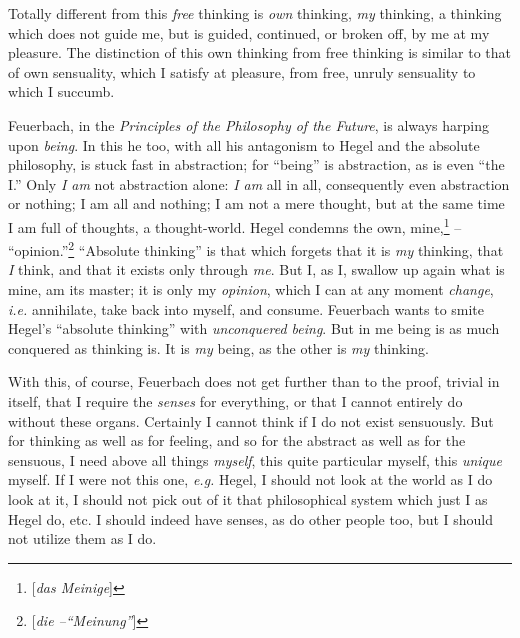 \documentclass[12pt,a4paper]{book}
\begin{document}
Totally different from this \textit{free} thinking is \textit{own} thinking, 
\textit{my} thinking, a thinking which does not guide me, but is guided, 
continued, or broken off, by me at my pleasure. The distinction of this own 
thinking from free thinking is similar to that of own sensuality, which I 
satisfy at pleasure, from free, unruly sensuality to which I succumb.

Feuerbach, in the \textit{Principles of the Philosophy of the Future}, is 
always harping upon \textit{being}. In this he too, with all his antagonism to 
Hegel and the absolute philosophy, is stuck fast in abstraction; for 
``being'' is abstraction, as is even ``the I.'' Only \textit{I am} not 
abstraction alone: \textit{I am} all in all, consequently even abstraction or 
nothing; I am all and nothing; I am not a mere thought, but at the same time I 
am full of thoughts, a thought-world. Hegel condemns the own, 
mine,\footnote{[\textit{das Meinige}]} -- ``opinion.''\footnote{[\textit{die 
--``Meinung''}]} ``Absolute thinking'' is that which forgets that it is 
\textit{my} thinking, that \textit{I} think, and that it exists only through 
\textit{me}. But I, as I, swallow up again what is mine, am its master; it is 
only my \textit{opinion}, which I can at any moment \textit{change}, 
\textit{i.e.} annihilate, take back into myself, and consume. Feuerbach wants 
to smite Hegel's ``absolute thinking'' with \textit{unconquered being}. But 
in me being is as much conquered as thinking is. It is \textit{my} being, as 
the other is \textit{my} thinking.

With this, of course, Feuerbach does not get further than to the proof, 
trivial in itself, that I require the \textit{senses} for everything, or that 
I cannot entirely do without these organs. Certainly I cannot think if I do 
not exist sensuously. But for thinking as well as for feeling, and so for the 
abstract as well as for the sensuous, I need above all things \textit{myself}, 
this quite particular myself, this \textit{unique} myself. If I were not this 
one, \textit{e.g.} Hegel, I should not look at the world as I do look at it, 
I should not pick out of it that philosophical system which just I as Hegel 
do, etc. I should indeed have senses, as do other people too, but I should not 
utilize them as I do.
\end{document}
